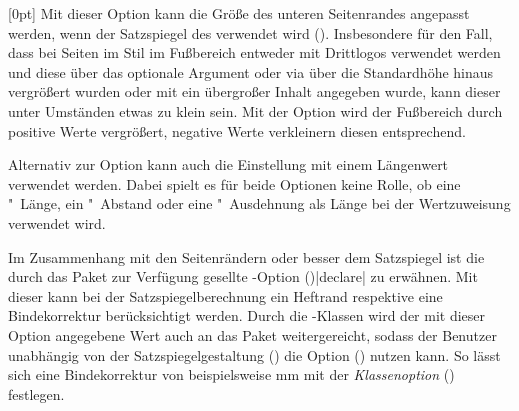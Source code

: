 \begin{Declaration*}{}
\begin{Declaration*}{}
\begin{Declaration*}{}
\begin{Declaration}[v2.03]{}[0pt]%
\printdeclarationlist%
%
Mit dieser Option kann die Größe des unteren Seitenrandes angepasst werden, 
wenn der Satzspiegel des \CDs verwendet wird ().
Insbesondere für den Fall, dass bei Seiten im Stil  
im Fußbereich entweder mit  Drittlogos verwendet werden und 
diese über das optionale Argument oder via  über die 
Standardhöhe hinaus vergrößert wurden oder mit  ein 
übergroßer Inhalt angegeben wurde, kann dieser unter Umständen etwas zu klein 
sein. Mit der Option  wird der Fußbereich durch 
positive Werte vergrößert, negative Werte verkleinern diesen entsprechend. 

Alternativ zur Option  kann auch die Einstellung 
 mit einem Längenwert verwendet werden. 
Dabei spielt es für beide Optionen keine Rolle, ob eine "~Länge, 
ein "~Abstand oder eine "~Ausdehnung als Länge bei der 
Wertzuweisung verwendet wird.
\end{Declaration}

%
%
Im Zusammenhang mit den Seitenrändern oder besser dem Satzspiegel ist die durch 
das Paket  zur Verfügung gesellte \KOMAScript-Option 
()|declare| zu erwähnen. Mit dieser 
kann bei der Satzspiegelberechnung ein Heftrand respektive eine Bindekorrektur 
berücksichtigt werden. Durch die \TUDScript-Klassen wird der mit dieser Option 
angegebene Wert auch an das Paket  weitergereicht, sodass der 
Benutzer unabhängig von der Satzspiegelgestaltung () die 
Option () nutzen kann. So lässt sich eine 
Bindekorrektur von beispielsweise \unit[5]{mm} mit der \emph{Klassenoption} 
() festlegen.


\end{Declaration*}
\end{Declaration*}
\end{Declaration*}
